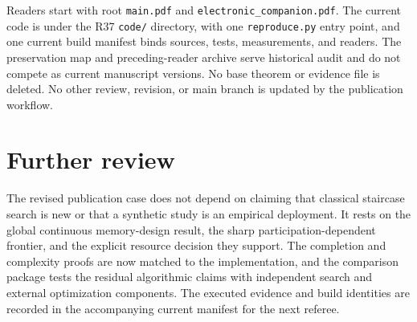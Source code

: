 \documentclass[11pt,letterpaper]{article}
\theoremstyle{definition}\newtheorem{assumption}[theorem]{Assumption}
\begin{document}
Readers start with root \texttt{main.\allowbreak{}pdf} and \texttt{electronic\_\allowbreak{}companion.\allowbreak{}pdf}. The current code is under the R37 \texttt{code/\allowbreak{}} directory, with one \texttt{reproduce.\allowbreak{}py} entry point, and one current build manifest binds sources, tests, measurements, and readers. The preservation map and preceding-reader archive serve historical audit and do not compete as current manuscript versions. No base theorem or evidence file is deleted. No other review, revision, or main branch is updated by the publication workflow.

\section*{Further review}

The revised publication case does not depend on claiming that classical staircase search is new or that a synthetic study is an empirical deployment. It rests on the global continuous memory-design result, the sharp participation-dependent frontier, and the explicit resource decision they support. The completion and complexity proofs are now matched to the implementation, and the comparison package tests the residual algorithmic claims with independent search and external optimization components. The executed evidence and build identities are recorded in the accompanying current manifest for the next referee.

\end{document}
